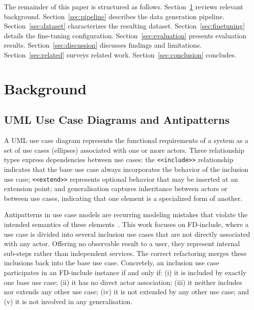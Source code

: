\documentclass[12pt, a4paper]{article}
\begin{document}
The remainder of this paper is structured as follows.
Section~\ref{sec:background} reviews relevant background.
Section~\ref{sec:pipeline} describes the data generation pipeline.
Section~\ref{sec:dataset} characterizes the resulting dataset.
Section~\ref{sec:finetuning} details the fine-tuning configuration.
Section~\ref{sec:evaluation} presents evaluation results.
Section~\ref{sec:discussion} discusses findings and limitations.
Section~\ref{sec:related} surveys related work.
Section~\ref{sec:conclusion} concludes.

\section{Background}
\label{sec:background}

\subsection{UML Use Case Diagrams and Antipatterns}

A UML use case diagram represents the functional requirements of a system as
a set of use cases (ellipses) associated with one or more actors.  Three
relationship types express dependencies between use cases: the
\texttt{<<include>>} relationship indicates that the base use case always
incorporates the behavior of the inclusion use case; \texttt{<<extend>>}
represents optional behavior that may be inserted at an extension point; and
generalisation captures inheritance between actors or between use cases,
indicating that one element is a specialized form of another.

Antipatterns in use case models are recurring modeling mistakes that violate
the intended semantics of these elements~\cite{elattar2010improving}.
This work focuses on FD-include, where a use case is divided into several
inclusion use cases that are not directly associated with any actor.
Offering no observable result to a user, they represent internal sub-steps
rather than independent services.
The correct refactoring merges these inclusions back into the base use case.
Concretely, an inclusion use case participates in an FD-include instance
if and only if: (i) it is included by exactly one base use case; (ii) it has
no direct actor association; (iii) it neither includes nor extends any other
use case; (iv) it is not extended by any other use case; and (v) it is not
involved in any generalisation.
\end{document}
